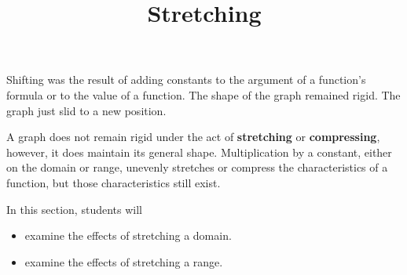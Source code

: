 \documentclass{ximera}
\title{Stretching}
\begin{document}
\begin{abstract}
\end{abstract}
\maketitle




Shifting was the result of adding constants to the argument of a function's formula or to the value of a function.  The shape of the graph remained rigid. The graph just slid to a new position. 



A graph does not remain rigid under the act of \textbf{stretching} or \textbf{compressing}, however, it does maintain its general shape. Multiplication by a constant, either on the domain or range, unevenly stretches or compress the characteristics of a function, but those characteristics still exist.






















\begin{sectionOutcomes}
In this section, students will 

\begin{itemize}
\item examine the effects of stretching a domain.
\item examine the effects of stretching a range.
\end{itemize}
\end{sectionOutcomes}
\end{document}
